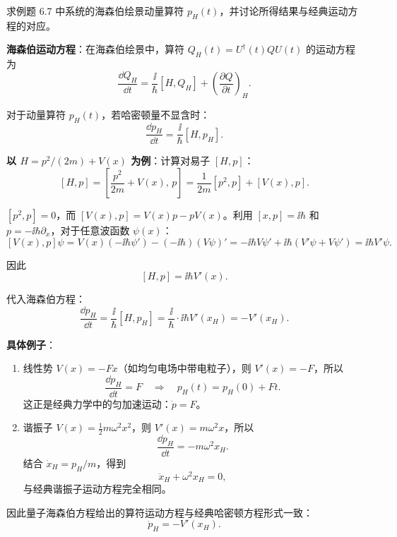 \begin{question}
求例题 6.7 中系统的海森伯绘景动量算符 $p_H(t)$，并讨论所得结果与经典运动方程的对应。
\end{question}
\begin{solution}
	\textbf{海森伯运动方程}：在海森伯绘景中，算符 $Q_H(t)=U^\dagger(t)Q U(t)$ 的运动方程为
	\[
	\frac{\dd Q_H}{\dd t} = \frac{\ii}{\hbar}[H,Q_H] + \left(\frac{\partial Q}{\partial t}\right)_H.
	\]

	对于动量算符 $p_H(t)$，若哈密顿量不显含时：
	\[
	\frac{\dd p_H}{\dd t} = \frac{\ii}{\hbar}[H,p_H].
	\]

	\textbf{以 $H=p^2/(2m)+V(x)$ 为例}：计算对易子 $[H,p]$：
	\[
	[H,p] = \left[\frac{p^2}{2m}+V(x),\,p\right]
	= \frac{1}{2m}[p^2,p] + [V(x),p].
	\]

	$[p^2,p]=0$，而 $[V(x),p] = V(x)p - pV(x)$。利用 $[x,p]=\ii\hbar$ 和 $p=-\ii\hbar\partial_x$，对于任意波函数 $\psi(x)$：
	\[
	[V(x),p]\psi = V(x)(-\ii\hbar\psi') - (-\ii\hbar)(V\psi)' = -\ii\hbar V\psi' + \ii\hbar(V'\psi+V\psi') = \ii\hbar V'\psi.
	\]

	因此
	\[
	[H,p] = \ii\hbar V'(x).
	\]

	代入海森伯方程：
	\[
	\frac{\dd p_H}{\dd t} = \frac{\ii}{\hbar}[H,p_H] = \frac{\ii}{\hbar}\cdot\ii\hbar V'(x_H) = -V'(x_H).
	\]

	\textbf{具体例子}：
	\begin{enumerate}
	\item 线性势 $V(x) = -Fx$（如均匀电场中带电粒子），则 $V'(x) = -F$，所以
	\[
	\frac{\dd p_H}{\dd t} = F \quad\Longrightarrow\quad p_H(t) = p_H(0) + Ft.
	\]
	这正是经典力学中的匀加速运动：$\dot p = F$。

	\item 谐振子 $V(x)=\frac12 m\omega^2 x^2$，则 $V'(x)=m\omega^2 x$，所以
	\[
	\frac{\dd p_H}{\dd t} = -m\omega^2 x_H.
	\]
	结合 $\dot x_H = p_H/m$，得到
	\[
	\ddot x_H + \omega^2 x_H = 0,
	\]
	与经典谐振子运动方程完全相同。
	\end{enumerate}

	因此量子海森伯方程给出的算符运动方程与经典哈密顿方程形式一致：
	\[
	\boxed{\dot p_H = -V'(x_H)}.
	\]
	\end{solution}


